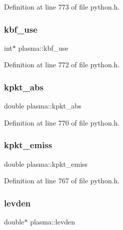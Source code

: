 Definition at line 773 of file python.\+h.

\mbox{\label{structplasma_a031771037948baffc308ebe398140f4e}} 
\subsubsection{\texorpdfstring{kbf\+\_\+use}{kbf\_use}}
{\footnotesize\ttfamily int$\ast$ plasma\+::kbf\+\_\+use}



Definition at line 772 of file python.\+h.

\mbox{\label{structplasma_aa9ee2846f568c0a0de1f7848ff747301}} 
\subsubsection{\texorpdfstring{kpkt\+\_\+abs}{kpkt\_abs}}
{\footnotesize\ttfamily double plasma\+::kpkt\+\_\+abs}



Definition at line 770 of file python.\+h.

\mbox{\label{structplasma_a3a7cb2d0cfcfe01e21e43f7e4fe4e9a8}} 
\subsubsection{\texorpdfstring{kpkt\+\_\+emiss}{kpkt\_emiss}}
{\footnotesize\ttfamily double plasma\+::kpkt\+\_\+emiss}



Definition at line 767 of file python.\+h.

\mbox{\label{structplasma_a4fb98583700310c3abbf6fa266c755c0}} 
\subsubsection{\texorpdfstring{levden}{levden}}
{\footnotesize\ttfamily double$\ast$ plasma\+::levden}



